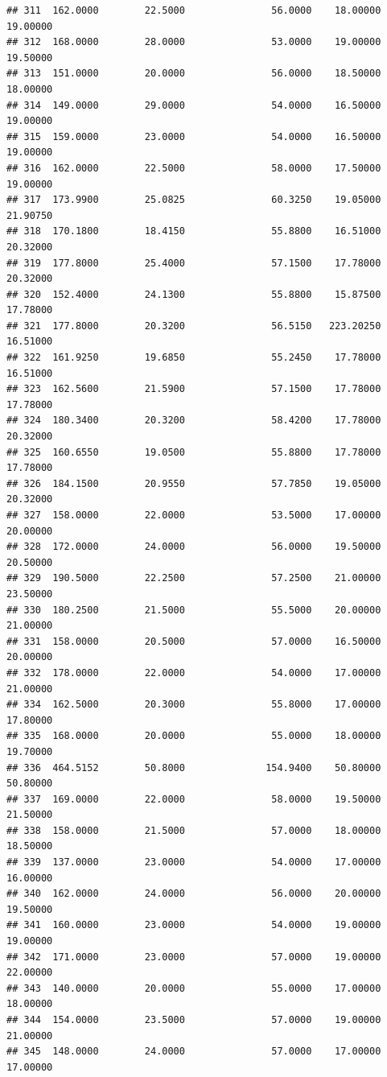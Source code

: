 \documentclass[]{article}
\begin{document}
\begin{verbatim}
## 311  162.0000        22.5000               56.0000    18.00000   19.00000
## 312  168.0000        28.0000               53.0000    19.00000   19.50000
## 313  151.0000        20.0000               56.0000    18.50000   18.00000
## 314  149.0000        29.0000               54.0000    16.50000   19.00000
## 315  159.0000        23.0000               54.0000    16.50000   19.00000
## 316  162.0000        22.5000               58.0000    17.50000   19.00000
## 317  173.9900        25.0825               60.3250    19.05000   21.90750
## 318  170.1800        18.4150               55.8800    16.51000   20.32000
## 319  177.8000        25.4000               57.1500    17.78000   20.32000
## 320  152.4000        24.1300               55.8800    15.87500   17.78000
## 321  177.8000        20.3200               56.5150   223.20250   16.51000
## 322  161.9250        19.6850               55.2450    17.78000   16.51000
## 323  162.5600        21.5900               57.1500    17.78000   17.78000
## 324  180.3400        20.3200               58.4200    17.78000   20.32000
## 325  160.6550        19.0500               55.8800    17.78000   17.78000
## 326  184.1500        20.9550               57.7850    19.05000   20.32000
## 327  158.0000        22.0000               53.5000    17.00000   20.00000
## 328  172.0000        24.0000               56.0000    19.50000   20.50000
## 329  190.5000        22.2500               57.2500    21.00000   23.50000
## 330  180.2500        21.5000               55.5000    20.00000   21.00000
## 331  158.0000        20.5000               57.0000    16.50000   20.00000
## 332  178.0000        22.0000               54.0000    17.00000   21.00000
## 334  162.5000        20.3000               55.8000    17.00000   17.80000
## 335  168.0000        20.0000               55.0000    18.00000   19.70000
## 336  464.5152        50.8000              154.9400    50.80000   50.80000
## 337  169.0000        22.0000               58.0000    19.50000   21.50000
## 338  158.0000        21.5000               57.0000    18.00000   18.50000
## 339  137.0000        23.0000               54.0000    17.00000   16.00000
## 340  162.0000        24.0000               56.0000    20.00000   19.50000
## 341  160.0000        23.0000               54.0000    19.00000   19.00000
## 342  171.0000        23.0000               57.0000    19.00000   22.00000
## 343  140.0000        20.0000               55.0000    17.00000   18.00000
## 344  154.0000        23.5000               57.0000    19.00000   21.00000
## 345  148.0000        24.0000               57.0000    17.00000   17.00000

\end{verbatim}
\end{document}
